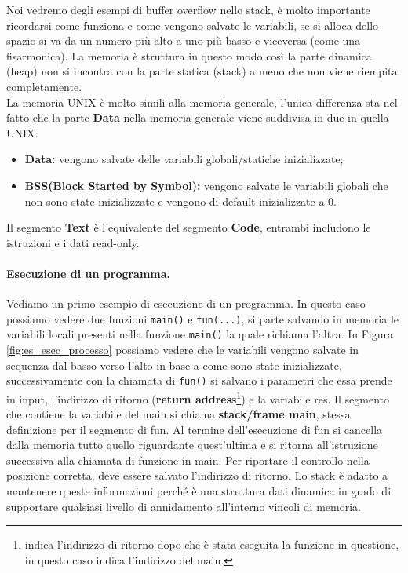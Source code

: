 Noi vedremo degli esempi di buffer overflow nello stack, è molto importante ricordarsi
come funziona e come vengono salvate le variabili, se si alloca dello spazio si va da
un numero più alto a uno più basso e viceversa (come una fisarmonica). La memoria è
struttura in questo modo così la parte dinamica (heap) non si incontra con la parte
statica (stack) a meno che non viene riempita completamente.\\
La memoria UNIX è molto simili alla memoria generale, l'unica differenza sta nel
fatto che la parte \textbf{Data} nella memoria generale viene suddivisa in due in
quella UNIX:

\begin{itemize}
    \item \textbf{Data:} vengono salvate delle variabili globali/statiche
          inizializzate;
    \item \textbf{BSS(Block Started by Symbol):} vengono salvate le variabili globali
          che non sono state inizializzate e vengono di default inizializzate a 0.
\end{itemize}

Il segmento \textbf{Text} è l'equivalente del segmento \textbf{Code}, entrambi
includono le istruzioni e i dati read-only.

\paragraph{Esecuzione di un programma.}
Vediamo un primo esempio di esecuzione di un programma.
In questo caso possiamo vedere due funzioni \verb|main()| e \verb|fun(...)|, si parte
salvando in memoria le variabili locali presenti nella funzione \verb|main()| la
quale richiama l'altra. In Figura \ref{fig:es_esec_processo} possiamo vedere che le
variabili vengono salvate in sequenza dal basso verso l'alto in base a come sono state
inizializzate, successivamente con la chiamata di \verb|fun()| si salvano i parametri
che essa prende in input, l'indirizzo di
ritorno (\textbf{return address}\footnote{indica l'indirizzo di ritorno dopo che è
    stata eseguita la funzione in questione, in questo caso indica l'indirizzo del main.})
e la variabile res. Il segmento che contiene la variabile del main si
chiama \textbf{stack/frame main}, stessa definizione per il segmento di fun.
Al termine dell'esecuzione di fun si cancella dalla memoria tutto quello riguardante
quest'ultima e si ritorna all'istruzione successiva alla chiamata di funzione in main.
Per riportare il controllo nella posizione corretta, deve essere salvato l'indirizzo
di ritorno. Lo stack è adatto a mantenere queste informazioni perché è una struttura
dati dinamica in grado di supportare qualsiasi livello di annidamento all'interno
vincoli di memoria.

